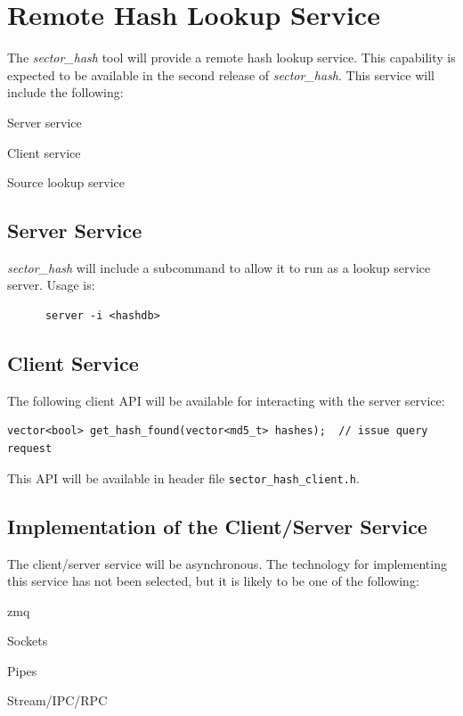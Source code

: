 \documentclass[10pt,twoside]{article}
\newcommand{\sh}{\emph{sector\_hash}\xspace}
\begin{document}
\section{Remote Hash Lookup Service}
The \sh tool will provide a remote hash lookup service.
This capability is expected to be available in the second release of \sh.
This service will include the following:
\begin{compactitem}
\item Server service
\item Client service
\item Source lookup service
\end{compactitem}
\subsection{Server Service}
\sh will include a subcommand to allow it to run as a lookup service server.
Usage is:
\begin{small}
\begin{verbatim}
      server -i <hashdb>
\end{verbatim}
\end{small}
\subsection{Client Service}
The following client API will be available for interacting with the server service:
\begin{small}
\begin{verbatim}
vector<bool> get_hash_found(vector<md5_t> hashes);  // issue query request
\end{verbatim}
\end{small}
This API will be available in header file \texttt{sector\_hash\_client.h}.
\subsection{Implementation of the Client/Server Service}
The client/server service will be asynchronous.
The technology for implementing this service has not been selected,
but it is likely to be one of the following:
\begin{compactitem}
\item zmq
\item Sockets
\item Pipes
\item Stream/IPC/RPC
\end{compactitem}
\end{document}
